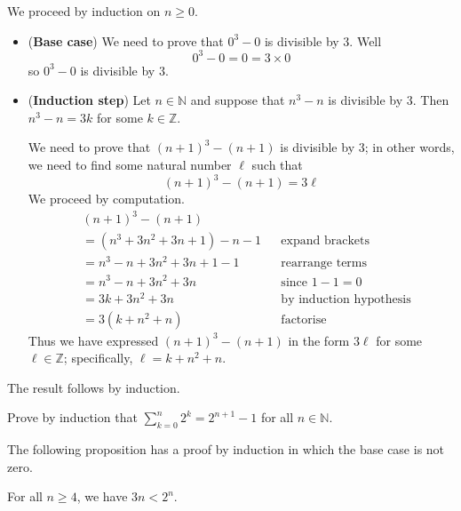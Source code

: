 \begin{cproof}
We proceed by induction on $n \ge 0$.
\begin{itemize}
\item (\textbf{Base case}) We need to prove that $0^3-0$ is divisible by $3$. Well
\[ 0^3-0 = 0 = 3 \times 0 \]
so $0^3-0$ is divisible by $3$.

\item (\textbf{Induction step}) Let $n \in \mathbb{N}$ and suppose that $n^3-n$ is divisible by $3$. Then $n^3-n = 3k$ for some $k \in \mathbb{Z}$.

We need to prove that $(n+1)^3 - (n+1)$ is divisible by $3$; in other words, we need to find some natural number $\ell$ such that
\[ (n+1)^3 - (n+1) = 3\ell \]
We proceed by computation.
\begin{align*}
& (n+1)^3 - (n+1) && \\
&= (n^3 + 3n^2 + 3n + 1) - n - 1 && \text{expand brackets}\\
&= n^3 - n + 3n^2 + 3n + 1 - 1 && \text{rearrange terms} \\
&= n^3 - n + 3n^2 + 3n && \text{since $1 - 1 = 0$} \\
&= 3k + 3n^2 + 3n && \text{by induction hypothesis} \\
&= 3(k+n^2+n) && \text{factorise}
\end{align*}
Thus we have expressed $(n+1)^3-(n+1)$ in the form $3\ell$ for some $\ell \in \mathbb{Z}$; specifically, $\ell=k+n^2+n$.
\end{itemize}

The result follows by induction.
\end{cproof}

\begin{exercise}
\label{exSumOfPowersOf2}
Prove by induction that $\displaystyle \sum_{k=0}^n 2^k = 2^{n+1} - 1$ for all $n \in \mathbb{N}$.
\end{exercise}

The following proposition has a proof by induction in which the base case is not zero.

\begin{proposition}
\label{propWeakInductionNonzeroBaseCaseExample}
For all $n \ge 4$, we have $3n < 2^n$.
\end{proposition}

